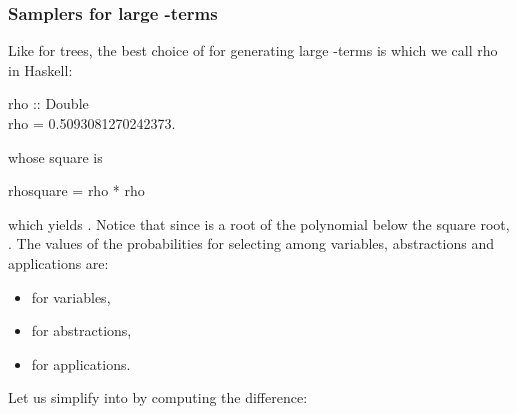 \documentclass{sig-alternate}
\begin{document}
\begin{figure*}[!t]
\subsubsection*{Samplers for large -terms}

Like for trees,  the best choice of  for generating large
-terms is  which we call \<rho\> in \textsf{Haskell}:
\begin{haskell}
  rho :: Double\\
  rho = 0.5093081270242373.
\end{haskell}
whose square is
\begin{haskell}
  rhosquare = rho * rho
\end{haskell}
which yields .  Notice that since  is a root of the
polynomial below the square root, .  The values
of the probabilities for selecting among variables, abstractions and applications
are:
\begin{itemize}
\item  for variables,
\item  for abstractions,
\item  for applications.
\end{itemize}
Let us simplify  into  by computing
the difference:


\end{figure*}
\end{document}
